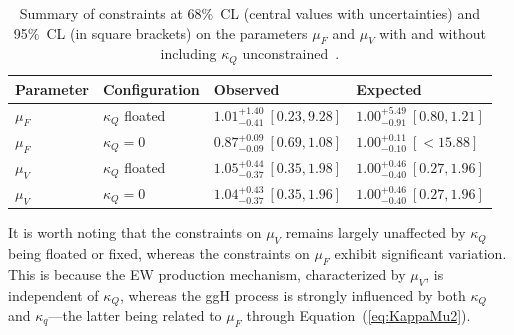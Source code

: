 \begin{table}[!hbt]
\centering
\begin{tabular}{llll}
Parameter       &     Configuration     & {Observed}          &  {Expected}   \\
\hline
$\mu_F$     & $\kappa_Q$ floated & $1.01^{+1.40}_{-0.41} ~[0.23,9.28]$   &  $1.00^{+5.49}_{-0.91} ~[0.80,1.21]$ \\
$\mu_F$     & $\kappa_Q=0$       & $0.87^{+0.09}_{-0.09} ~[0.69,1.08]$   &  $1.00^{+0.11}_{-0.10} ~[ < 15.88]$  \\
$\mu_V$     & $\kappa_Q$ floated & $1.05^{+0.44}_{-0.37} ~[0.35,1.98]$   &  $1.00^{+0.46}_{-0.40} ~[0.27,1.96]$  \\
$\mu_V$     & $\kappa_Q=0$       & $1.04^{+0.43}_{-0.37} ~[0.35,1.96]$   &  $1.00^{+0.46}_{-0.40} ~[0.27,1.96]$  \\
\end{tabular}
\caption{
Summary of constraints at 68\%~CL (central values with uncertainties) and 95\%~CL (in square brackets) on the parameters $\mu_F$ and $\mu_V$ with and without including $\kappa_Q$ unconstrained~\cite{PhysRevD.111.092014}.}
\label{table:offshellKappa}
\end{table}



It is worth noting that the constraints on $\mu_V$ remains largely unaffected by $\kappa_Q$ being floated or fixed, whereas the constraints on $\mu_F$ exhibit significant variation. This is because the EW production mechanism, characterized by $\mu_V$, is independent of $\kappa_Q$, whereas the ggH process is strongly influenced by both $\kappa_Q$ and $\kappa_q$---the latter being related to $\mu_F$ through Equation~(\ref{eq:KappaMu2}).

